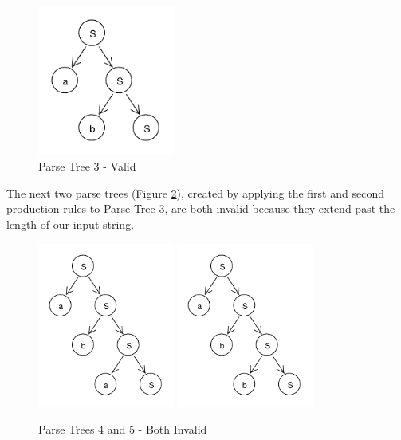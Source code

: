 \documentclass[11pt]{article}
\begin{document}
\begin{figure}[h!]
    \centering
    \includegraphics[width=0.4\textwidth,natwidth=30,natheight=30]{umlet/rdp_3.pdf}
    \caption{Parse Tree 3 - Valid}
    \label{fig:rdp_3}
\end{figure}

The next two parse trees (Figure \ref{fig:rdp_4_5}), created by applying the first and second production rules to
Parse Tree 3, are both invalid because they extend past the length of our input string.

\begin{figure}[h!]
    \centering
    \includegraphics[width=0.4\textwidth,natwidth=30,natheight=30]{umlet/rdp_4.pdf}
    \includegraphics[width=0.4\textwidth,natwidth=30,natheight=30]{umlet/rdp_5.pdf}
    \caption{Parse Trees 4 and 5 - Both Invalid}
    \label{fig:rdp_4_5}
\end{figure}
\end{document}
